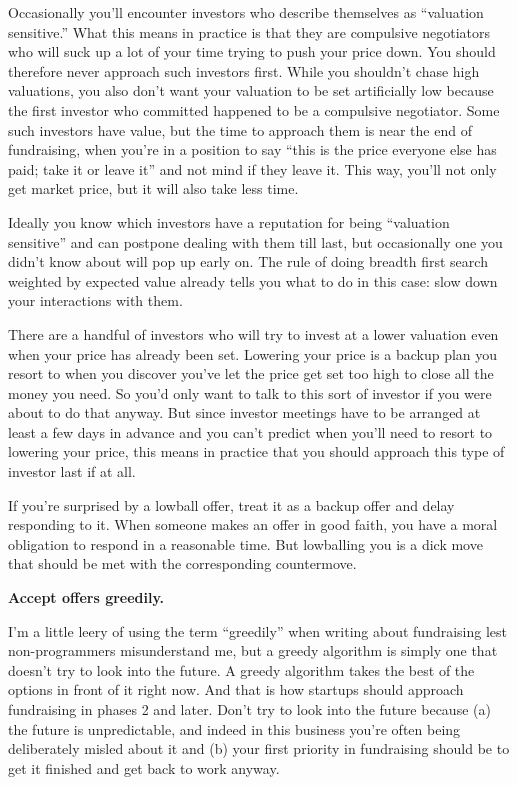 \documentclass[12pt]{book}
\begin{document}
Occasionally you'll encounter investors who describe themselves as
``valuation sensitive.'' What this means in practice is that they are
compulsive negotiators who will suck up a lot of your time trying to
push your price down. You should therefore never approach such investors
first. While you shouldn't chase high valuations, you also don't want
your valuation to be set artificially low because the first investor who
committed happened to be a compulsive negotiator. Some such investors
have value, but the time to approach them is near the end of
fundraising, when you're in a position to say ``this is the price
everyone else has paid; take it or leave it'' and not mind if they leave
it. This way, you'll not only get market price, but it will also take
less time.

Ideally you know which investors have a reputation for being ``valuation
sensitive'' and can postpone dealing with them till last, but
occasionally one you didn't know about will pop up early on. The rule of
doing breadth first search weighted by expected value already tells you
what to do in this case: slow down your interactions with them.

There are a handful of investors who will try to invest at a lower
valuation even when your price has already been set. Lowering your price
is a backup plan you resort to when you discover you've let the price
get set too high to close all the money you need. So you'd only want to
talk to this sort of investor if you were about to do that anyway. But
since investor meetings have to be arranged at least a few days in
advance and you can't predict when you'll need to resort to lowering
your price, this means in practice that you should approach this type of
investor last if at all.

If you're surprised by a lowball offer, treat it as a backup offer and
delay responding to it. When someone makes an offer in good faith, you
have a moral obligation to respond in a reasonable time. But lowballing
you is a dick move that should be met with the corresponding
countermove.

\textbf{Accept offers greedily.}

I'm a little leery of using the term ``greedily'' when writing about
fundraising lest non-programmers misunderstand me, but a greedy
algorithm is simply one that doesn't try to look into the future. A
greedy algorithm takes the best of the options in front of it right now.
And that is how startups should approach fundraising in phases 2 and
later. Don't try to look into the future because (a) the future is
unpredictable, and indeed in this business you're often being
deliberately misled about it and (b) your first priority in fundraising
should be to get it finished and get back to work anyway.
\end{document}
